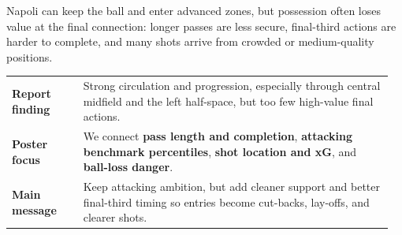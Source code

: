 \documentclass[a0paper,portrait,margin=18mm]{tikzposter}
\begin{document}
\maketitle

{
\Large
Napoli can keep the ball and enter advanced zones, but possession often loses value at the
final connection: longer passes are less secure, final-third actions are harder to complete,
and many shots arrive from crowded or medium-quality positions.

\medskip
\begin{tabular}{>{\bfseries}p{0.18\linewidth}p{0.78\linewidth}}
Report finding &
Strong circulation and progression, especially through central midfield and the left half-space,
but too few high-value final actions.\\
Poster focus &
We connect \textbf{pass length and completion}, \textbf{attacking benchmark percentiles},
\textbf{shot location and xG}, and \textbf{ball-loss danger}.\\
Main message &
Keep attacking ambition, but add cleaner support and better final-third timing so entries
become cut-backs, lay-offs, and clearer shots.
\end{tabular}
}
\end{document}
